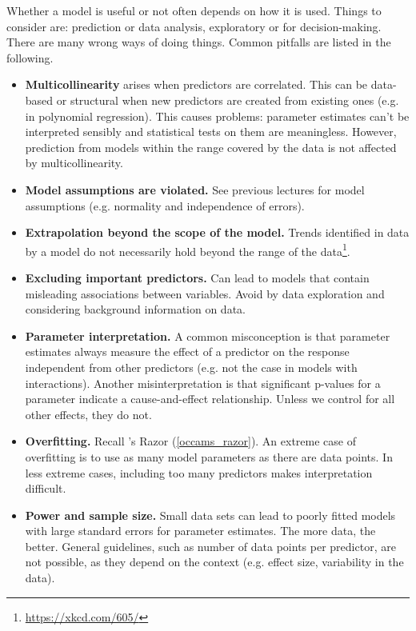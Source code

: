 Whether a model is useful or not often depends on how it is used. Things to consider are: prediction or data analysis, exploratory or for decision-making. There are many wrong ways of doing things. Common pitfalls are listed in the following.
\begin{itemize}
	\item \textbf{Multicollinearity} arises when predictors are correlated. This can be data-based or structural when new predictors are created from existing ones (e.g. in polynomial regression). This causes problems: parameter estimates can't be interpreted sensibly and statistical tests on them are meaningless. However, prediction from models within the range covered by the data is not affected by multicollinearity.
	\item \textbf{Model assumptions are violated.} See previous lectures for model assumptions (e.g. normality and independence of errors).
	\item \textbf{Extrapolation beyond the scope of the model.} Trends identified in data by a model do not necessarily hold beyond the range of the data\footnote{\url{https://xkcd.com/605/}}.
	\item \textbf{Excluding important predictors.} Can lead to models that contain misleading associations between variables. Avoid by data exploration and considering background information on data.
	\item \textbf{Parameter interpretation.} A common misconception is that parameter estimates always measure the effect of a predictor on the response independent from other predictors (e.g. not the case in models with interactions). Another misinterpretation is that significant p-values for a parameter indicate a cause-and-effect relationship. Unless we control for all other effects, they do not.
	\item \textbf{Overfitting.} Recall 's Razor (\cref{occams_razor}). An extreme case of overfitting is to use as many model parameters as there are data points. In less extreme cases, including too many predictors makes interpretation difficult.
	\item \textbf{Power and sample size.} Small data sets can lead to poorly fitted models with large standard errors for parameter estimates. The more data, the better. General guidelines, such as number of data points per predictor, are not possible, as they depend on the context (e.g. effect size, variability in the data).
\end{itemize}